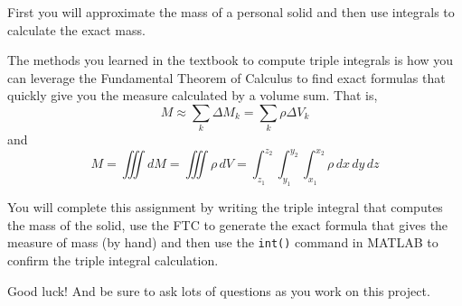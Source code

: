\documentclass{ximera}
\begin{document}
First you will approximate the mass of a personal solid and then use integrals to calculate the exact mass.

The methods you learned in the textbook to compute triple integrals is how you can leverage the Fundamental Theorem of Calculus to find exact formulas that quickly give you the measure calculated by a volume sum. 
That is,
\[
M \approx \sum_k \Delta M_k = \sum_k \rho \Delta V_k
\]
and
\[
M = \iiint dM = \iiint \rho \, dV = \int_{z_1}^{z_2} \int_{y_1}^{y_2} \int_{x_1}^{x_2} \rho \, dx \, dy \, dz
\]

You will complete this assignment by writing the triple integral that computes the mass of the solid, use the FTC to generate the exact formula that gives the measure of mass (by hand) and then use the \texttt{int()} command in MATLAB to confirm the triple integral calculation.

Good luck! And be sure to ask lots of questions as you work on this project.
\end{document}
